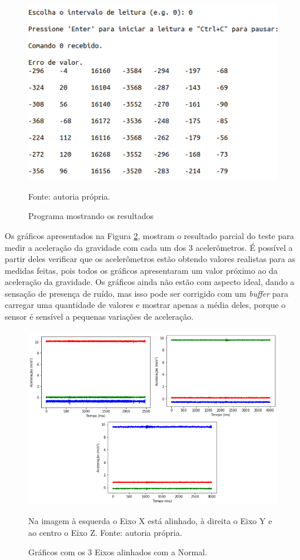 	\begin{figure}[h]
		\centering
		\includegraphics[keepaspectratio=true,scale=0.5]{figuras/programa_rodando.png}
		\caption{Programa mostrando os resultados}
		Fonte: autoria própria. 
		\label{rodando}	
	\end{figure}
	
		
	Os gráficos apresentados na Figura \ref{acelx_0}, mostram o resultado parcial do teste para medir a aceleração da gravidade com cada um dos 3 acelerômetros. É possível a partir deles verificar que os acelerômetros estão obtendo valores realistas para as medidas feitas, pois todos os gráficos apresentaram um valor próximo ao da aceleração da gravidade. Os gráficos ainda não estão com aspecto ideal, dando a sensação de presença de ruído, mas isso pode ser corrigido com um \textit{buffer} para carregar uma quantidade de valores e mostrar apenas a média deles, porque o sensor é sensível a pequenas variações de aceleração.   
	
	\begin{figure}[h]
		\centering
		\includegraphics[keepaspectratio=true,scale=0.5]{figuras/graficos_acel.png}
		\caption{Gráficos com os 3 Eixos alinhados com a Normal.}
		Na imagem à esquerda o Eixo X está alinhado, à direita o Eixo Y e ao centro o Eixo Z. \footnotesize
		Fonte: autoria própria. 
		\label{acelx_0}	
	\end{figure}		
	
